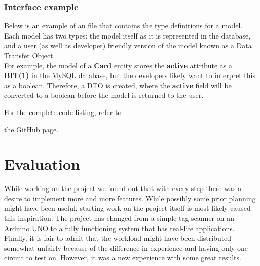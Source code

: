 \documentclass[a4paper,10pt]{article}
\begin{document}


\newpage



\newpage

\subsubsection{Interface example}

Below is an example of an file that contains the type definitions for a model. Each model has two types: the model itself as it is represented in the database, and a user (as well as developer) friendly version of the model known as a Data Transfer Object. \\
For example, the model of a \textbf{Card} entity stores the \textbf{active} attribute as a \textbf{BIT(1)} in the MySQL database, but the developers likely want to interpret this as a boolean. Therefore, a DTO is created, where the \textbf{active} field will be converted to a boolean before the model is returned to the user.


\par

For the complete code listing, refer to
{\centering \href{https://github.com/pertzis/TapGuard}{the GitHub page}.\par}

\section{Evaluation}
While working on the project we found out that with every step there was a desire to implement more and more features. While possibly some prior planning might have been useful, starting work on the project itself is most likely caused this inspiration. The project has changed from a simple tag scanner on an Arduino UNO to a fully functioning system that has real-life applications. Finally, it is fair to admit that the workload might have been distributed somewhat unfairly because of the difference in experience and having only one circuit to test on. However, it was a new experience with some great results.
\end{document}
